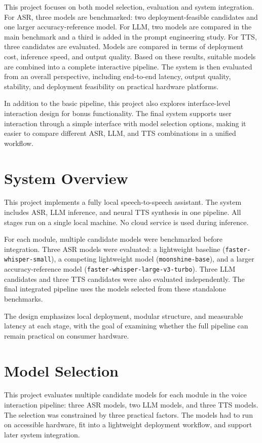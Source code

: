 \documentclass[12pt, a4paper]{article}
\begin{document}
This project focuses on both model selection, evaluation and system integration. For ASR, three models are benchmarked: two deployment-feasible candidates and one larger accuracy-reference model. For LLM, two models are compared in the main benchmark and a third is added in the prompt engineering study. For TTS, three candidates are evaluated. Models are compared in terms of deployment cost, inference speed, and output quality. Based on these results, suitable models are combined into a complete interactive pipeline. The system is then evaluated from an overall perspective, including end-to-end latency, output quality, stability, and deployment feasibility on practical hardware platforms.

In addition to the basic pipeline, this project also explores interface-level interaction design for bonus functionality. The final system supports user interaction through a simple interface with model selection options, making it easier to compare different ASR, LLM, and TTS combinations in a unified workflow.

\section{System Overview}

This project implements a fully local speech-to-speech assistant. The system includes ASR, LLM inference, and neural TTS synthesis in one pipeline. All stages run on a single local machine. No cloud service is used during inference.

For each module, multiple candidate models were benchmarked before integration. Three ASR models were evaluated: a lightweight baseline (\texttt{faster-whisper-small}), a competing lightweight model (\texttt{moonshine-base}), and a larger accuracy-reference model (\texttt{faster-whisper-large-v3-turbo}). Three LLM candidates and three TTS candidates were also evaluated independently. The final integrated pipeline uses the models selected from these standalone benchmarks.

The design emphasizes local deployment, modular structure, and measurable latency at each stage, with the goal of examining whether the full pipeline can remain practical on consumer hardware.

\section{Model Selection}

This project evaluates multiple candidate models for each module in the voice interaction pipeline: three ASR models, two LLM models, and three TTS models. The selection was constrained by three practical factors. The models had to run on accessible hardware, fit into a lightweight deployment workflow, and support later system integration.
\end{document}
